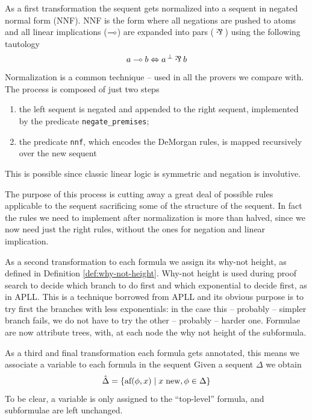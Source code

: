 \documentclass[a4paper, 12pt, tesi, english]{report}
\begin{document}
As a first transformation the sequent gets normalized into a sequent in negated normal form (NNF).
NNF is the form where all negations are pushed to atoms and all linear implications ($\multimap$) are expanded into pars ($\llpar$) using the following tautology
$$ a \lolli b \Leftrightarrow \llnot{a} \llpar b $$
Normalization is a common technique -- used in all the provers we compare with.
The process is composed of just two steps
\begin{enumerate}
	\item the left sequent is negated and appended to the right sequent, implemented by the predicate \texttt{negate\_premises};
	\item the predicate \texttt{nnf}, which encodes the DeMorgan rules, is mapped recursively over the new sequent
\end{enumerate}
This is possible since classic linear logic is symmetric and negation is involutive.

The purpose of this process is cutting away a great deal of possible rules applicable to the sequent sacrificing some of the structure of the sequent.
In fact the rules we need to implement after normalization is more than halved, since we now need just the right rules, without the ones for negation and linear implication.

As a second transformation to each formula we assign its why-not height, as defined in Definition \ref{def:why-not-height}.
Why-not height is used during proof search to decide which branch to do first and which exponential to decide first, as in APLL.
This is a technique borrowed from APLL and its obvious purpose is to try first the branches with less exponentials: in the case this -- probably -- simpler branch fails, we do not have to try the other -- probably -- harder one.
Formulae are now attribute trees, with, at each node the why not height of the subformula.

As a third and final transformation each formula gets annotated, this means we associate a variable to each formula in the sequent
Given a sequent $\Delta$ we obtain
$$ \hat{\Delta} = \{ \text{af}(\phi, x) \mid x \; \text{new}, \phi \in \Delta \} $$
To be clear, a variable is only assigned to the ``top-level'' formula, and subformulae are left unchanged.
\end{document}
